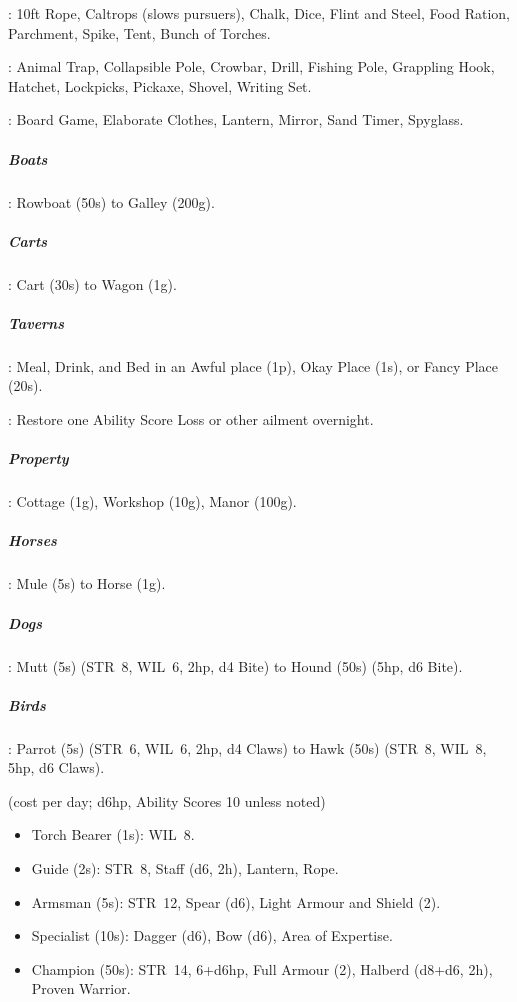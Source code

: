 \documentclass[itdr]{subfiles}
\begin{document}
: 10ft Rope, Caltrops (slows pursuers), Chalk, Dice, Flint and Steel, Food Ration, Parchment, Spike, Tent, Bunch of Torches.

: Animal Trap, Collapsible Pole, Crowbar, Drill, Fishing Pole, Grappling Hook, Hatchet, Lockpicks, Pickaxe, Shovel, Writing Set.

: Board Game, Elaborate Clothes, Lantern, Mirror, Sand Timer, Spyglass.


\subparagraph{Boats}: Rowboat (50s) to Galley (200g).
	
\subparagraph{Carts}: Cart (30s) to Wagon (1g).

\subparagraph{Taverns}: Meal, Drink, and Bed in an Awful place (1p), Okay Place (1s), or Fancy Place (20s).

: Restore one Ability Score Loss or other ailment overnight.

\subparagraph{Property}: Cottage (1g), Workshop (10g), Manor (100g).

\subparagraph{Horses}: Mule (5s) to Horse (1g).

\subparagraph{Dogs}: Mutt (5s) (STR~8, WIL~6, 2hp, d4 Bite) to Hound (50s) (5hp, d6 Bite).

\subparagraph{Birds}: Parrot (5s) (STR~6, WIL~6, 2hp, d4 Claws) to Hawk (50s) (STR~8, WIL~8, 5hp, d6 Claws).

 (cost per day; d6hp, Ability Scores 10
unless noted)
\begin{itemize}
	\item Torch Bearer (1s): WIL~8.
	\item Guide (2s): STR~8, Staff (d6, 2h), Lantern, Rope.
	\item Armsman (5s): STR~12, Spear (d6), Light Armour and Shield (2).
	\item Specialist (10s): Dagger (d6), Bow (d6), Area of Expertise.
	\item Champion (50s): STR~14, 6+d6hp, Full Armour (2), Halberd (d8+d6, 2h), Proven Warrior.
\end{itemize}

\break

\end{document}
